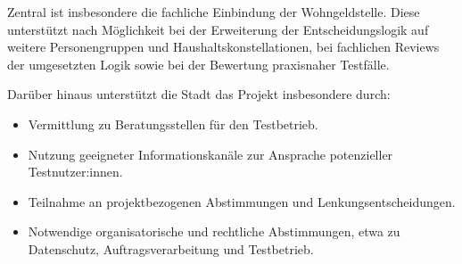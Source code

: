 Zentral ist insbesondere die fachliche Einbindung der Wohngeldstelle.
Diese unterstützt nach Möglichkeit bei der Erweiterung der
Entscheidungslogik auf weitere Personengruppen und Haushaltskonstellationen,
bei fachlichen Reviews der umgesetzten Logik sowie bei der Bewertung
praxisnaher Testfälle.

Darüber hinaus unterstützt die Stadt das Projekt insbesondere durch:

\begin{itemize}
  \item Vermittlung zu Beratungsstellen für den Testbetrieb.
  \item Nutzung geeigneter Informationskanäle zur Ansprache potenzieller Testnutzer:innen.
  \item Teilnahme an projektbezogenen Abstimmungen und Lenkungsentscheidungen.
  \item Notwendige organisatorische und rechtliche Abstimmungen, etwa zu Datenschutz, Auftragsverarbeitung und Testbetrieb.
\end{itemize}
